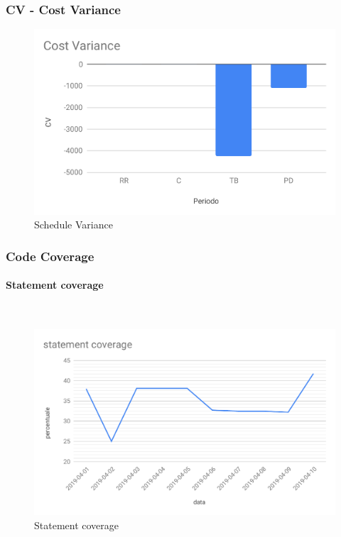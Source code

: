 \subsubsection{CV - Cost Variance}
\begin{figure}[H]
	\centering
	\includegraphics[scale=0.8]{res/images/RQ/cv.pdf}
	\caption{Schedule Variance}
\end{figure}


\subsubsection{Code Coverage}
\paragraph{Statement coverage}\mbox{}\\
\begin{figure}[H]
	\centering
	\includegraphics[scale=0.6]{res/images/RQ/statement-coverage-RQ.pdf}
	\caption{Statement coverage}
\end{figure}	
